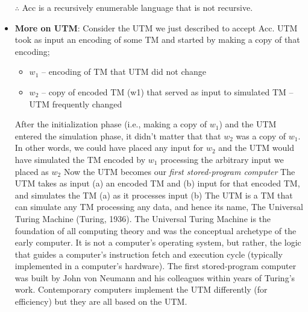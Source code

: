 \documentclass{report}
\begin{document}
\begin{itemize}
            \bigbreak \noindent 
            $\therefore$ Acc is a recursively enumerable language that is not recursive.
            \bigbreak \noindent 
        \item \textbf{More on UTM}: Consider the UTM we just described to accept Acc. UTM took as input an encoding of some TM and started by making a copy of that encoding;
            \begin{itemize}
                \item $w_{1}$ – encoding of TM that UTM did not change
                \item $w_{2}$ – copy of encoded TM (w1) that served as input to simulated TM – UTM frequently changed
            \end{itemize}
            \bigbreak \noindent 
            After the initialization phase (i.e., making a copy of $w_{1}$) and the UTM entered the simulation phase, it didn’t matter that that $w_{2}$ was a copy of $w_{1}$.
            \bigbreak \noindent 
        In other words, we could have placed any input for $w_{2}$ and the UTM would have simulated the TM encoded by $w_{1}$ processing the arbitrary input we placed as $w_{2}$
        \bigbreak \noindent 
        Now the UTM becomes our \textit{first stored-program computer}
        \bigbreak \noindent 
        The UTM takes as input (a) an encoded TM and (b) input for that encoded TM, and simulates the TM (a) as it processes input (b)
        \bigbreak \noindent 
        The UTM is a TM that can simulate any TM processing any data, and hence its name, The Universal Turing Machine (Turing, 1936).
        \bigbreak \noindent 
        The Universal Turing Machine is the foundation of all computing theory and was the conceptual archetype of the early computer.
        \bigbreak \noindent 
        It is not a computer’s operating system, but rather, the logic that guides a computer’s instruction fetch and execution cycle (typically implemented in a computer’s hardware).
        \bigbreak \noindent 
        The first stored-program computer was built by John von Neumann and his colleagues within years of Turing’s work.
        \bigbreak \noindent 
        Contemporary computers implement the UTM differently (for efficiency) but they are all based on the UTM.
    \end{itemize}

    \pagebreak 
\end{document}
